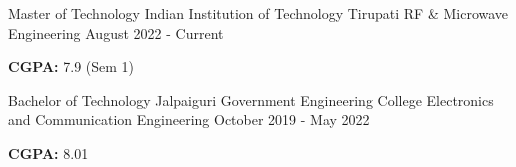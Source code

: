 

\begin{cventries}

  \cventry
    {Master of Technology} %
    {Indian Institution of Technology Tirupati} %
    {RF \& Microwave Engineering } %
    {August 2022 - Current} %
    {
      \begin{cvitems} %
        \item {\textbf{CGPA:} 7.9 (Sem 1)}
      \end{cvitems}
    }
    
  \cventry
    {Bachelor of Technology} %
    {Jalpaiguri Government Engineering College} %
    {Electronics and Communication Engineering} %
    {October 2019 - May 2022} %
    {
      \begin{cvitems} %
        \item {\textbf{CGPA:} 8.01}
      \end{cvitems}
    }


\end{cventries}
